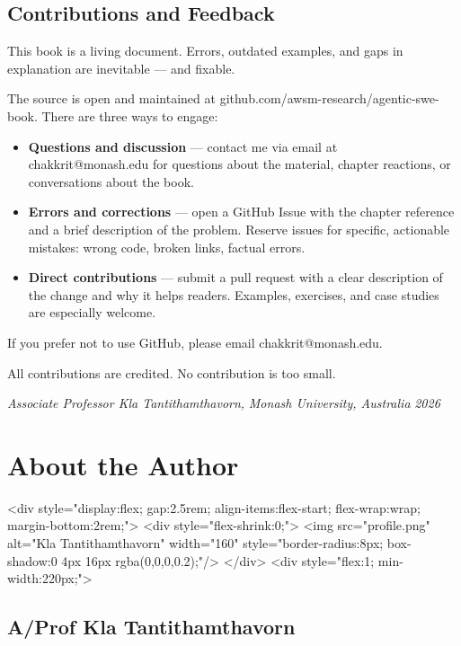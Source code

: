 \documentclass[11pt,a4paper]{book}
\begin{document}
\medskip

\section{Contributions and Feedback}

This book is a living document. Errors, outdated examples, and gaps in explanation are inevitable --- and fixable.

The source is open and maintained at github.com/awsm-research/agentic-swe-book. There are three ways to engage:

\begin{itemize}
  \item \textbf{Questions and discussion} --- contact me via email at chakkrit@monash.edu for questions about the material, chapter reactions, or conversations about the book.
  \item \textbf{Errors and corrections} --- open a GitHub Issue with the chapter reference and a brief description of the problem. Reserve issues for specific, actionable mistakes: wrong code, broken links, factual errors.
  \item \textbf{Direct contributions} --- submit a pull request with a clear description of the change and why it helps readers. Examples, exercises, and case studies are especially welcome.
\end{itemize}

If you prefer not to use GitHub, please email chakkrit@monash.edu.

All contributions are credited. No contribution is too small.

\medskip

\textit{Associate Professor Kla Tantithamthavorn,}
\textit{Monash University, Australia}
\textit{2026}


\chapter{About the Author}

<div style="display:flex; gap:2.5rem; align-items:flex-start; flex-wrap:wrap; margin-bottom:2rem;">
  <div style="flex-shrink:0;">
    <img src="profile.png" alt="Kla Tantithamthavorn" width="160" style="border-radius:8px; box-shadow:0 4px 16px rgba(0,0,0,0.2);"/>
  </div>
  <div style="flex:1; min-width:220px;">

\section{A/Prof Kla Tantithamthavorn}
\end{document}

